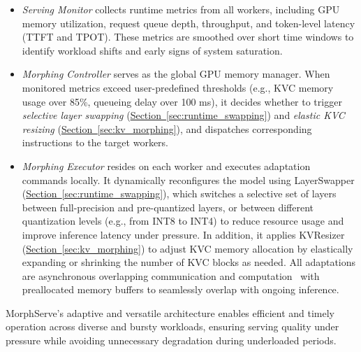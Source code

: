 \documentclass{article}
\newcommand{\system}{{MorphServe}\xspace}
\newcommand{\quant}{\small\textsf{LayerSwapper}\xspace}
\newcommand{\kvc}{\small\textsf{KVResizer}\xspace}
\begin{document}
\begin{itemize}[noitemsep,leftmargin=*]
\vspace*{-0.5em}

    \item \textit{Serving Monitor} collects runtime metrics from all workers, including GPU memory utilization, request queue depth, throughput, and token-level latency (TTFT and TPOT). These metrics are smoothed over short time windows to identify workload shifts and early signs of system saturation. 
    
    \item \textit{Morphing Controller} serves as the global GPU memory manager. When monitored metrics exceed user-predefined thresholds (e.g., KVC memory usage over 85\%, queueing delay over 100 ms), 
    it decides whether to trigger \textit{selective layer swapping} (\hyperref[sec:runtime_swapping]{Section~\ref{sec:runtime_swapping}}) and \textit{elastic KVC resizing} (\hyperref[sec:kv_morphing]{Section~\ref{sec:kv_morphing}}),
    and dispatches corresponding instructions to the target workers.   
    
    \item \textit{Morphing Executor} resides on each worker and executes adaptation commands locally. It dynamically reconfigures the model using {\quant} (\hyperref[sec:runtime_swapping]{Section~\ref{sec:runtime_swapping}}), which switches a selective set of layers between full-precision and pre-quantized layers, or between different quantization levels (e.g., from INT8 to INT4) to reduce resource usage and improve inference latency under pressure. In addition, it applies {\kvc} (\hyperref[sec:kv_morphing]{Section~\ref{sec:kv_morphing}}) to adjust KVC memory allocation by elastically expanding or shrinking the number of KVC blocks as needed. 
    All adaptations are asynchronous overlapping communication and computation~\cite{async_cuda_stream} with preallocated memory buffers to seamlessly overlap with ongoing inference.  

\vspace*{-0.5em}
\end{itemize}


{\system}'s adaptive and versatile architecture enables efficient and timely operation across diverse and bursty workloads, ensuring serving quality under pressure while avoiding unnecessary degradation during underloaded periods. 
\end{document}
